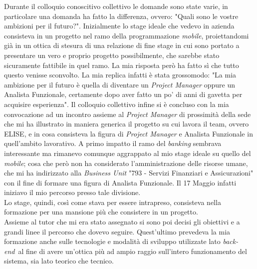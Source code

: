 
Durante il colloquio conoscitivo collettivo le domande sono state varie, in particolare una domanda ha fatto la differenza, ovvero: "Quali sono le vostre ambizioni per il futuro?". Inizialmente lo stage ideale che vedevo in azienda consisteva in un progetto nel ramo della programmazione \textit{mobile}, proiettandomi già in un ottica di stesura di una relazione di fine stage in cui sono portato a presentare un vero e proprio progetto possibilmente, che sarebbe stato sicuramente fattibile in quel ramo. La mia risposta però ha fatto sì che tutto questo venisse sconvolto. La mia replica infatti è stata grossomodo: "La mia ambizione per il futuro è quella di diventare un \textit{Project Manager} oppure un Analista Funzionale, certamente dopo aver fatto un po' di anni di gavetta per acquisire esperienza". Il colloquio collettivo infine si è concluso con la mia convocazione ad un incontro assieme al \textit{Project Manager} di prossimità della sede che mi ha illustrato in maniera generica il progetto su cui lavora il team, ovvero ELISE\glossario, e in cosa consisteva la figura di \textit{Project Manager} e Analista Funzionale in quell'ambito lavorativo. A primo impatto il ramo del \textit{banking} sembrava interessante ma rimanevo comunque aggrappato al mio stage ideale su quello del \textit{mobile}; cosa che però non ha considerato l'amministrazione delle risorse umane, che mi ha indirizzato alla \textit{Business Unit} "793 - Servizi Finanziari e Assicurazioni" con il fine di formare una figura di Analista Funzionale. Il 17 Maggio infatti iniziavo il mio percorso presso tale divisione.\\

Lo stage, quindi, così come stava per essere intrapreso, consisteva nella formazione per una mansione più che consistere in un progetto.\\

Assieme al tutor che mi era stato assegnato si sono poi decisi gli obiettivi e a grandi linee il percorso che dovevo seguire. Quest'ultimo prevedeva la mia formazione anche sulle tecnologie e modalità di sviluppo utilizzate lato \textit{back-end}\glossario\ al fine di avere un'ottica più ad ampio raggio sull'intero funzionamento del sistema, sia lato teorico che tecnico.
	
